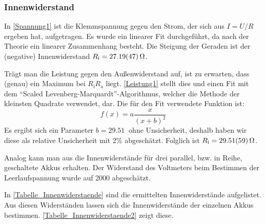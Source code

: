 \documentclass[
	a4paper,
	12pt,
	pagesize,
	ngerman
]{scrartcl}
\begin{document}
	\subsubsection{Innenwiderstand}
	In \cref{Spannung1} ist die Klemmspannung gegen den Strom, der sich aus $I = U/R$ ergeben hat, aufgetragen. 
	Es wurde ein linearer Fit durchgeführt, da nach der Theorie ein linearer Zusammenhang besteht. 
	Die Steigung der Geraden ist der (negative) Innenwiderstand $R_\text{i} = \SI{27,19 \pm 0,47}{\Omega}$.

	Trägt man die Leistung gegen den Außenwiderstand auf, ist zu erwarten, dass (genau) ein Maximum bei $R_\text{i}  R_\text{a}$ liegt. %
	\cref{Leistung1} stellt dies und einen Fit mit dem \enquote{Scaled Levenberg-Marquardt}-Algorithmus, welcher die Methode der kleinsten Quadrate verwendet, dar. 
	Die für den Fit verwendete Funktion ist:
	\begin{equation}
		f(x)=a\frac{x}{(x+b)^2}
	\end{equation}
	Es ergibt sich ein Parameter $b = \SI{29,51}{}$ ohne Unsicherheit, deshalb haben wir diese als relative Unsicherheit mit 2\% abgeschätzt. %
	Folglich ist $R_\text{i} = \SI{29,51 \pm 0,59}{\Omega}$.

	Analog kann man aus  die Innenwiderstände für drei parallel, bzw. in Reihe, geschaltete Akkus erhalten. 
	Der Widerstand des Voltmeters beim Bestimmen der Leerlaufspannung wurde auf \SI{2000}{\Omega} abgeschätzt.

	In \cref{Tabelle_Innenwiderstaende} sind die ermittelten Innenwiderstände aufgelistet. 
	Aus diesen Widerständen lassen sich die Innenwiderstände der einzelnen Akkus bestimmen.
	\cref{Tabelle_Innenwiderstaende2} zeigt diese. 
\end{document}
